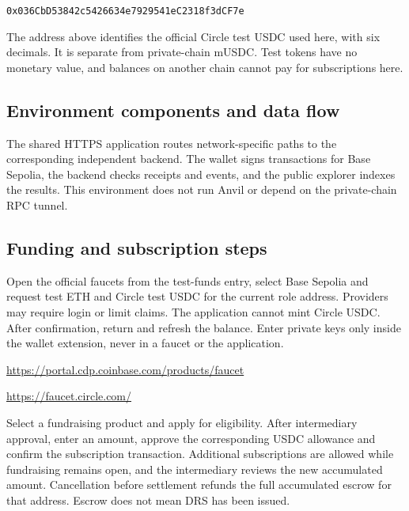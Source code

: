 \documentclass[12pt,a4paper]{article}
\begin{document}
\nolinkurl{0x036CbD53842c5426634e7929541eC2318f3dCF7e}\par
The address above identifies the official Circle test USDC used here, with six decimals. It is separate from private-chain mUSDC. Test tokens have no monetary value, and balances on another chain cannot pay for subscriptions here.

\subsection{Environment components and data flow}
\begin{center}\end{center}
The shared HTTPS application routes network-specific paths to the corresponding independent backend. The wallet signs transactions for Base Sepolia, the backend checks receipts and events, and the public explorer indexes the results. This environment does not run Anvil or depend on the private-chain RPC tunnel.

\subsection{Funding and subscription steps}
Open the official faucets from the test-funds entry, select Base Sepolia and request test ETH and Circle test USDC for the current role address. Providers may require login or limit claims. The application cannot mint Circle USDC. After confirmation, return and refresh the balance. Enter private keys only inside the wallet extension, never in a faucet or the application.

\url{https://portal.cdp.coinbase.com/products/faucet}\par\url{https://faucet.circle.com/}\par
Select a fundraising product and apply for eligibility. After intermediary approval, enter an amount, approve the corresponding USDC allowance and confirm the subscription transaction. Additional subscriptions are allowed while fundraising remains open, and the intermediary reviews the new accumulated amount. Cancellation before settlement refunds the full accumulated escrow for that address. Escrow does not mean DRS has been issued.
\end{document}
